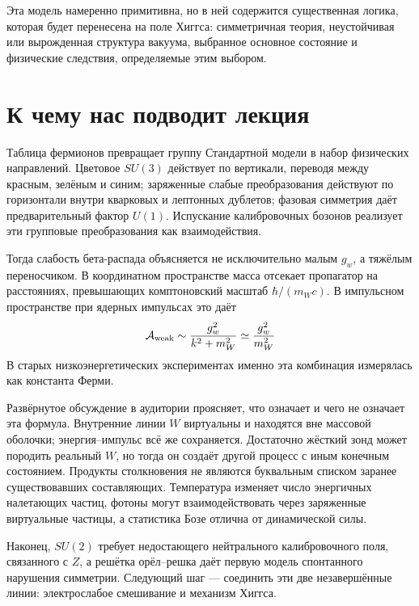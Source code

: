 Эта модель намеренно примитивна, но в ней содержится существенная логика, которая будет перенесена на поле Хиггса: симметричная теория, неустойчивая или вырожденная структура вакуума, выбранное основное состояние и физические следствия, определяемые этим выбором.

\section{К чему нас подводит лекция}

Таблица фермионов превращает группу Стандартной модели в набор физических направлений. Цветовое \(SU(3)\) действует по вертикали, переводя между красным, зелёным и синим; заряженные слабые преобразования действуют по горизонтали внутри кварковых и лептонных дублетов; фазовая симметрия даёт предварительный фактор \(U(1)\). Испускание калибровочных бозонов реализует эти групповые преобразования как взаимодействия.

Тогда слабость бета-распада объясняется не исключительно малым \(g_w\), а тяжёлым переносчиком. В координатном пространстве масса отсекает пропагатор на расстояниях, превышающих комптоновский масштаб \(\hbar/(m_Wc)\). В импульсном пространстве при ядерных импульсах это даёт
\begin{equation}
  \mathcal A_{\rm weak}
  \sim\frac{g_w^2}{k^2+m_W^2}
  \simeq\frac{g_w^2}{m_W^2}
\end{equation}
В старых низкоэнергетических экспериментах именно эта комбинация измерялась как константа Ферми.

Развёрнутое обсуждение в аудитории проясняет, что означает и чего не означает эта формула. Внутренние линии \(W\) виртуальны и находятся вне массовой оболочки; энергия--импульс всё же сохраняется. Достаточно жёсткий зонд может породить реальный \(W\), но тогда он создаёт другой процесс с иным конечным состоянием. Продукты столкновения не являются буквальным списком заранее существовавших составляющих. Температура изменяет число энергичных налетающих частиц, фотоны могут взаимодействовать через заряженные виртуальные частицы, а статистика Бозе отлична от динамической силы.

Наконец, \(SU(2)\) требует недостающего нейтрального калибровочного поля, связанного с \(Z\), а решётка орёл--решка даёт первую модель спонтанного нарушения симметрии. Следующий шаг — соединить эти две незавершённые линии: электрослабое смешивание и механизм Хиггса.
